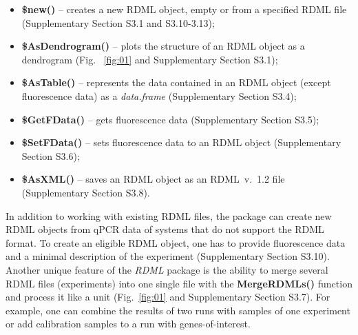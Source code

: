 \documentclass{bioinfo}
\begin{document}
\begin{itemize} 
\item \textbf{\$new()} -- creates a new RDML object, empty or from a specified RDML 
file (Supplementary Section S3.1 and S3.10-3.13);
\item \textbf{\$AsDendrogram()} -- plots the
structure of an RDML object as a dendrogram (Fig.~ \ref{fig:01} and Supplementary Section 
S3.1);
\item \textbf{\$AsTable()} -- represents the data contained in an RDML object (except 
fluorescence data) as a \textit{data.frame} (Supplementary Section S3.4);
\item \textbf{\$GetFData()} -- gets fluorescence data (Supplementary Section S3.5);
\item \textbf{\$SetFData()} -- sets fluorescence data to an RDML object (Supplementary Section S3.6); 
\item \textbf{\$AsXML()} – saves an RDML object as an RDML~v.~1.2 file (Supplementary Section S3.8).
\end{itemize}
In addition to working with existing RDML files, the package can create new RDML 
objects from qPCR data of systems that do not support the RDML format. To 
create an eligible RDML object, one has to provide fluorescence data and a minimal 
description of the experiment (Supplementary Section S3.10). Another unique feature of the \textit{RDML} 
package is the ability to merge several RDML files (experiments) into one single file with the 
\textbf{MergeRDMLs()} function and process it like a unit (Fig.~\ref{fig:01} and Supplementary Section 
S3.7). For example, one can combine the results of two runs with samples of one 
experiment or add calibration samples to a run with genes-of-interest.
\end{document}

